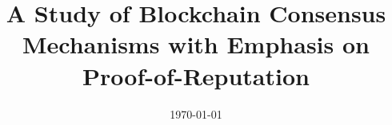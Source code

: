 \documentclass[doublespacing]{bmcart}
\begin{document}
\linenumbers
\begin{CJK*}{UTF8}{gbsn}

\begin{frontmatter}

\begin{fmbox}

\date{\today}
\title{A Study of Blockchain Consensus Mechanisms with Emphasis on Proof-of-Reputation
}
\maketitle


\author[
   addressref={aff1},                   %
   email={yidi.xing@insa-lyon.fr}   %
]{ }

\author[
   addressref={aff1},              
   email={omar.hasan@insa-lyon.fr}   %
]{ }

\author[
   addressref={aff1},              
   email={sonia.benmokhtar@insa-lyon.fr}   %
]{ }

\author[
   addressref={aff1},              
   email={tarek.awwad@insa-lyon.fr}   %
]{ }


\end{fmbox}
\end{frontmatter}
\end{CJK*}
\end{document}
